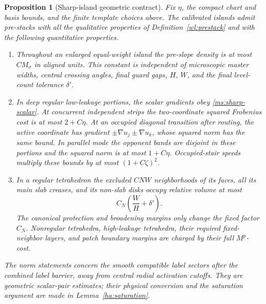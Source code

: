 \documentclass[11pt]{article}
\numberwithin{equation}{section}
\newtheorem{proposition}[theorem]{Proposition}
\theoremstyle{definition}
\theoremstyle{remark}
\begin{document}
\begin{proposition}[Sharp-island geometric contract]
\label{ms:sharp-contract}
Fix $\eta$, the compact chart and basis bounds, and the finite
template choices above.  The calibrated islands admit pre-stacks
with all the qualitative properties of Definition~\ref{wl:prestack} and
with the following quantitative properties.
\begin{enumerate}
\item Throughout an enlarged equal-weight island the pre-slope
density is at most $CM_\sigma$ in aligned units.  This constant
is independent of microscopic master widths, central crossing
angles, final guard gaps, $H$, $W$, and the final level-count
tolerance $\delta'$.
\item In deep regular low-leakage portions, the scalar gradients
obey \eqref{ms:sharp-scalar}.  At concurrent independent strips
the two-coordinate squared Frobenius cost is at most $2+C\eta$.
At an occupied diagonal transition after routing, the active
coordinate has gradient $\pm\nabla u_j\pm\nabla u_k$, whose
squared norm has the same bound.  In parallel mode the opponent
bands are disjoint in these portions and the squared norm is at
most $1+C\eta$.  Occupied-stair speeds multiply these bounds by
at most $(1+C\zeta)^2$.
\item In a regular tetrahedron the excluded $CNW$ neighborhoods
of its faces, all its main slab creases, and its non-slab disks
occupy relative volume at most
\begin{equation}
 C_N\left(\frac WH+\delta'\right).
 \label{ms:dirty-volume}
\end{equation}
The canonical protection and broadening margins only change the
fixed factor $C_N$.  Nonregular tetrahedra, high-leakage
tetrahedra, their required fixed-neighbor layers, and patch
boundary margins are charged by their full $M^p$-cost.
\end{enumerate}
The norm statements concern the smooth compatible label sectors
after the combined label barrier, away from central radial
activation cutoffs.  They are geometric scalar-pair estimates;
their physical conversion and the saturation argument are made
in Lemma~\ref{ha:saturation}.
\end{proposition}
\end{document}
